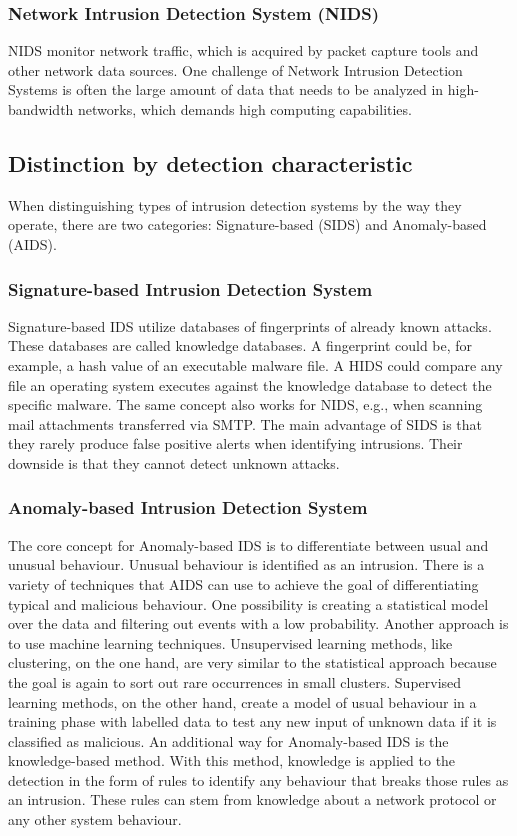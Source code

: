 \documentclass[
    fontsize=12pt,
    headings=small,
    parskip=half,           %
    bibliography=totoc,
    numbers=noenddot,       %
    open=any,               %
    ]{scrreprt}
\begin{document}
\subsubsection{Network Intrusion Detection System (NIDS)}
NIDS monitor network traffic, which is acquired by packet capture tools and other network data sources. One challenge of Network Intrusion Detection Systems is often the large amount of data that needs to be analyzed in high-bandwidth networks, which demands high computing capabilities.

\subsection{Distinction by detection characteristic}
When distinguishing types of intrusion detection systems by the way they operate, there are two categories: Signature-based (SIDS) and Anomaly-based (AIDS).

\subsubsection{Signature-based Intrusion Detection System}
Signature-based IDS utilize databases of fingerprints of already known attacks. These databases are called knowledge databases. A fingerprint could be, for example, a hash value of an executable malware file. A HIDS could compare any file an operating system executes against the knowledge database to detect the specific malware. The same concept also works for NIDS, e.g., when scanning mail attachments transferred via SMTP. The main advantage of SIDS is that they rarely produce false positive alerts when identifying intrusions. Their downside is that they cannot detect unknown attacks.

\subsubsection{Anomaly-based Intrusion Detection System}
The core concept for Anomaly-based IDS is to differentiate between usual and unusual behaviour. Unusual behaviour is identified as an intrusion. There is a variety of techniques that AIDS can use to achieve the goal of differentiating typical and malicious behaviour. One possibility is creating a statistical model over the data and filtering out events with a low probability. 
Another approach is to use machine learning techniques. Unsupervised learning methods, like clustering, on the one hand, are very similar to the statistical approach because the goal is again to sort out rare occurrences in small clusters. Supervised learning methods, on the other hand, create a model of usual behaviour in a training phase with labelled data to test any new input of unknown data if it is classified as malicious. 
An additional way for Anomaly-based IDS is the knowledge-based method. With this method, knowledge is applied to the detection in the form of rules to identify any behaviour that breaks those rules as an intrusion. These rules can stem from knowledge about a network protocol or any other system behaviour.
\end{document}
